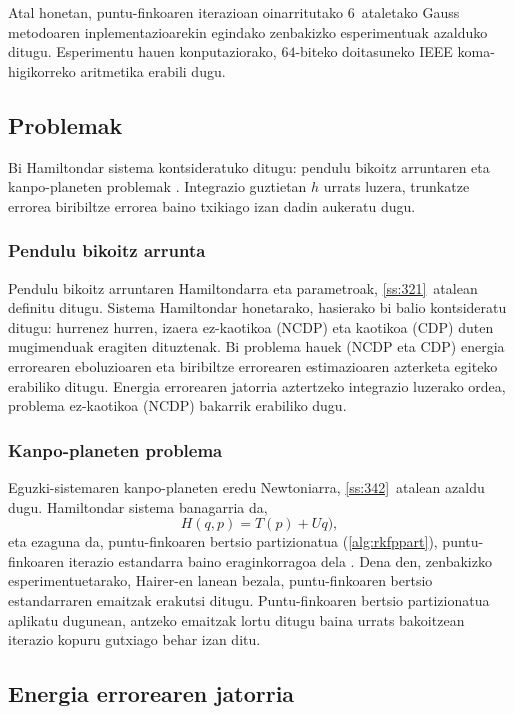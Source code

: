 Atal honetan, puntu-finkoaren iterazioan oinarritutako $6$~ataletako Gauss metodoaren inplementazioarekin egindako zenbakizko esperimentuak azalduko ditugu. Esperimentu hauen konputaziorako, $64$-biteko doitasuneko IEEE koma-higikorreko aritmetika erabili dugu.

\subsection{Problemak}

Bi Hamiltondar sistema kontsideratuko ditugu: pendulu bikoitz arruntaren eta kanpo-planeten problemak \cite{Hairer2006} \cite{Dumitru}. Integrazio guztietan $h$ urrats luzera, trunkatze errorea biribiltze errorea baino txikiago izan dadin aukeratu dugu.

\subsubsection*{Pendulu bikoitz arrunta}
Pendulu bikoitz arruntaren Hamiltondarra eta parametroak, \ref{ss:321}~atalean definitu ditugu. Sistema Hamiltondar honetarako, hasierako bi balio kontsideratu ditugu: hurrenez hurren, izaera ez-kaotikoa (NCDP) eta kaotikoa (CDP) duten mugimenduak eragiten dituztenak. Bi problema hauek (NCDP eta CDP) energia errorearen eboluzioaren eta biribiltze errorearen estimazioaren azterketa egiteko erabiliko ditugu. Energia errorearen jatorria aztertzeko integrazio luzerako ordea, problema ez-kaotikoa (NCDP) bakarrik erabiliko dugu.       

\subsubsection*{Kanpo-planeten problema}
Eguzki-sistemaren kanpo-planeten eredu Newtoniarra, \ref{ss:342}~atalean azaldu dugu. Hamiltondar sistema banagarria da,
\begin{equation*}
H(q,p)= T(p)+Uq),
\end{equation*}
eta ezaguna da, puntu-finkoaren bertsio partizionatua (\ref{alg:rkfppart}), puntu-finkoaren iterazio estandarra baino eraginkorragoa dela  \cite{Sanz-Serna1992}. Dena den, zenbakizko esperimentuetarako, Hairer-en \cite{Hairer2008} lanean bezala, puntu-finkoaren bertsio estandarraren emaitzak erakutsi ditugu. Puntu-finkoaren bertsio partizionatua aplikatu dugunean, antzeko emaitzak lortu ditugu baina urrats bakoitzean iterazio kopuru gutxiago behar izan ditu.  


\subsection{Energia errorearen jatorria}

